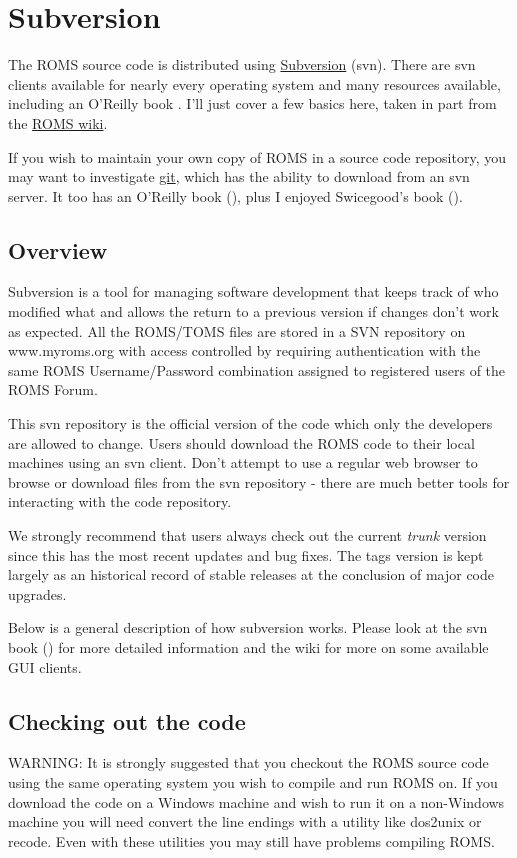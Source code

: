 \section{Subversion}
\label{Svn}

The ROMS source code is distributed using
\href{http://subversion.tigris.org}{Subversion} (svn). There are svn
clients available for nearly every operating system and many
resources available, including an O'Reilly book \cite{SVN}. I'll
just cover a few basics here, taken in part from the
\href{https://www.myroms.org/wiki/index.php/Subversion}{ROMS wiki}.

If you wish to maintain your own copy of ROMS in a source code
repository, you may want to investigate \href{http://git-scm.com/}{git},
which has the ability to download from an svn server. It too has
an O'Reilly book (\cite{GIT2}), plus I enjoyed Swicegood's book
(\cite{GIT1}).

\subsection{Overview}
Subversion is a tool for managing software development that keeps
track of who modified what and allows the return to a previous
version if changes don't work as expected. All the ROMS/TOMS files
are stored in a SVN repository on www.myroms.org with access
controlled by requiring authentication with the same ROMS
Username/Password combination assigned to registered users of the
ROMS Forum.

This svn repository is the official version of the code which only
the developers are allowed to change. Users should download the ROMS
code to their local machines using an svn client. Don't attempt to
use a regular web browser to browse or download files from the svn
repository - there are much better tools for interacting with the
code repository.

We strongly recommend that users always check out the current {\em trunk}
version since this has the most recent updates and bug fixes. The
tags version is kept largely as an historical record of stable
releases at the conclusion of major code upgrades.

Below is a general description of how subversion works. Please look
at the svn book (\cite{SVN}) for more detailed information and the wiki
for more on some available GUI clients.

\subsection{Checking out the code}
WARNING: It is strongly suggested that you checkout the ROMS source
code using the same operating system you wish to compile and run
ROMS on. If you download the code on a Windows machine and wish to
run it on a non-Windows machine you will need convert the line
endings with a utility like dos2unix or recode. Even with these
utilities you may still have problems compiling ROMS.

